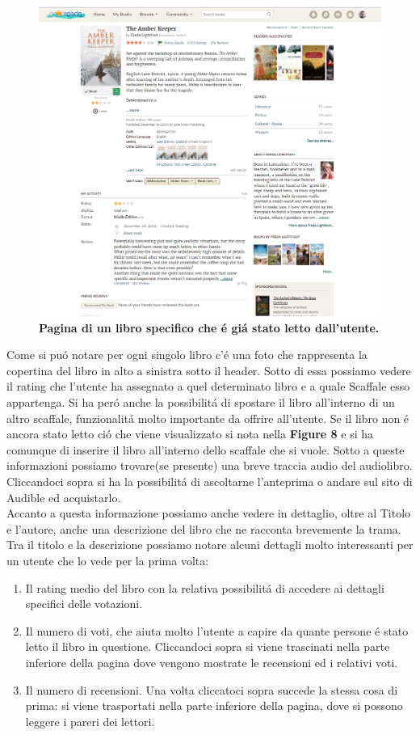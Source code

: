 \documentclass[12pt]{article}
\begin{document}
\begin{figure}
	\centering 
	\includegraphics[width=16.5cm]{resources/book.png}
	\caption{\textbf{Pagina di un libro specifico che \'e gi\'a stato letto dall'utente.}}
\end{figure}
Come si pu\'o notare per ogni singolo libro c'\'e una foto che rappresenta la copertina del libro in alto a sinistra sotto il header. Sotto di essa possiamo vedere il rating che l'utente ha assegnato a quel determinato libro e a quale Scaffale esso appartenga. Si ha per\'o anche la possibilit\'a di spostare il libro all'interno di un altro scaffale, funzionalit\'a molto importante da offrire all'utente. Se il libro non \'e ancora stato letto ci\'o che viene visualizzato si nota nella \textbf{Figure 8} e si ha comunque di inserire il libro all'interno dello scaffale che si vuole. Sotto a queste informazioni possiamo trovare(se presente) una breve traccia audio del audiolibro. Cliccandoci sopra si ha la possibilit\'a di ascoltarne l'anteprima o andare sul sito di Audible ed acquistarlo.\\
Accanto a questa informazione possiamo anche vedere in dettaglio, oltre al Titolo e l'autore, anche una descrizione del libro che ne racconta brevemente la trama. Tra il titolo e la descrizione possiamo notare alcuni dettagli molto interessanti per un utente che lo vede per la prima volta:

\begin{enumerate}
	\item Il rating medio del libro con la relativa possibilit\'a di accedere ai dettagli specifici delle votazioni.
	\item Il numero di voti, che aiuta molto l'utente a capire da quante persone \'e stato letto il libro in questione. Cliccandoci sopra si viene trascinati nella parte inferiore della pagina dove vengono mostrate le recensioni ed i relativi voti. 
	\item Il numero di recensioni. Una volta cliccatoci sopra succede la stessa cosa di prima: si viene trasportati nella parte inferiore della pagina, dove si possono leggere i pareri dei lettori.
\end{enumerate}
\end{document}
